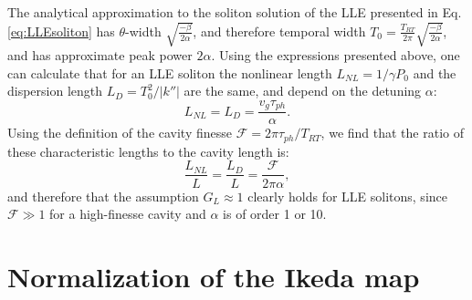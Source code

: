 The analytical approximation to the soliton solution of the LLE presented in Eq. \ref{eq:LLEsoliton} has $\theta$-width $\sqrt{\frac{-\beta}{2\alpha}}$, and therefore temporal width $T_0=\frac{T_{RT}}{2\pi} \sqrt{\frac{-\beta}{2\alpha}}$, and has approximate peak power $2\alpha$. Using the expressions presented above, one can calculate that for an LLE soliton the nonlinear length $L_{NL}=1/\gamma P_0$ and the dispersion length $L_D=T_0^2/|k''|$ are the same, and depend on the detuning $\alpha$:
\begin{equation}
L_{NL}=L_D=\frac{v_g\tau_{ph}}{\alpha}.
\end{equation}
Using the definition of the cavity finesse $\mathcal{F}=2\pi\tau_{ph}/T_{RT}$, we find that the ratio of these characteristic lengths to the cavity length is:
\begin{equation}
\frac{L_{NL}}{L}=\frac{L_D}{L}=\frac{\mathcal{F}}{2\pi\alpha},
\end{equation}
and therefore that the assumption $G_L\approx 1$ clearly holds for LLE solitons, since $\mathcal{F}\gg1$ for a high-finesse cavity and $\alpha$ is of order 1 or 10.

\section{Normalization of the Ikeda map}

